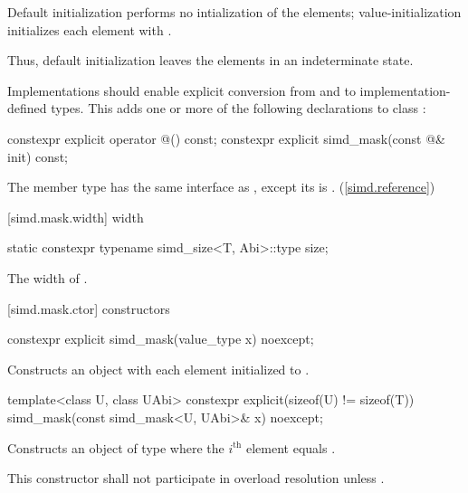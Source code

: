 \pnum
Default initialization performs no intialization of the elements; value-initialization initializes each element with . \begin{note}Thus, default initialization leaves the elements in an indeterminate state.\end{note}

\pnum
Implementations should enable explicit conversion from and to implementation-defined types. This adds one or more of the following declarations to class :

\begin{codeblock}
constexpr explicit operator @\impdef@() const;
constexpr explicit simd_mask(const @\impdef@& init) const;
\end{codeblock}

\pnum
The member type  has the same interface as , except its  is . (\ref{simd.reference})

[simd.mask.width]{ width}

\begin{itemdecl}
static constexpr typename simd_size<T, Abi>::type size;
\end{itemdecl}

\begin{itemdescr}
  \pnum\returns
  The width of .
\end{itemdescr}

[simd.mask.ctor]{\texorpdfstring{ constructors}{simd_mask constructors}}

\begin{itemdecl}
constexpr explicit simd_mask(value_type x) noexcept;
\end{itemdecl}

\begin{itemdescr}
  \pnum\effects
  Constructs an object with each element initialized to .
\end{itemdescr}

\begin{itemdecl}
template<class U, class UAbi>
  constexpr explicit(sizeof(U) != sizeof(T)) simd_mask(const simd_mask<U, UAbi>& x) noexcept;
\end{itemdecl}

\begin{itemdescr}
  \pnum\effects
  Constructs an object of type  where the $i^\text{th}$ element equals  \foralli.

  \pnum\remarks
  This constructor shall not participate in overload resolution unless .
\end{itemdescr}

